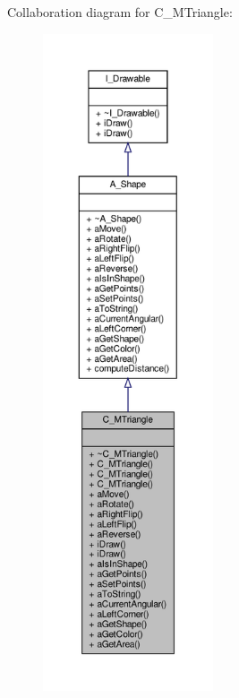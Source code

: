 Collaboration diagram for C\+\_\+\+M\+Triangle\+:\nopagebreak
\begin{figure}[H]
\begin{center}
\leavevmode
\includegraphics[height=550pt]{classC__MTriangle__coll__graph}
\end{center}
\end{figure}
